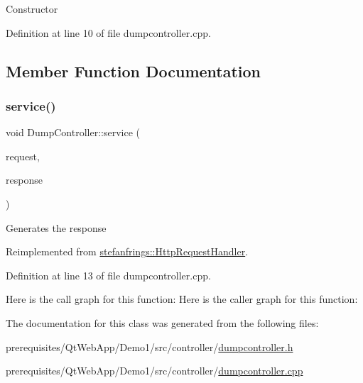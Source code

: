 Constructor 

Definition at line 10 of file dumpcontroller.\+cpp.



\subsection{Member Function Documentation}
\mbox{\label{class_dump_controller_ab2d5b920d9b2ec9310d2e57ed1e8e32f}} 
\subsubsection{\texorpdfstring{service()}{service()}}
{\footnotesize\ttfamily void Dump\+Controller\+::service (\begin{DoxyParamCaption}\item[{\mbox{\hyperlink{classstefanfrings_1_1_http_request}{Http\+Request}} \&}]{request,  }\item[{\mbox{\hyperlink{classstefanfrings_1_1_http_response}{Http\+Response}} \&}]{response }\end{DoxyParamCaption})\hspace{0.3cm}{\ttfamily [virtual]}}

Generates the response 

Reimplemented from \mbox{\hyperlink{classstefanfrings_1_1_http_request_handler_a0a7210907152c46b8b5a47feb64cf6bd}{stefanfrings\+::\+Http\+Request\+Handler}}.



Definition at line 13 of file dumpcontroller.\+cpp.

Here is the call graph for this function\+:
Here is the caller graph for this function\+:


The documentation for this class was generated from the following files\+:\begin{DoxyCompactItemize}
\item 
prerequisites/\+Qt\+Web\+App/\+Demo1/src/controller/\mbox{\hyperlink{dumpcontroller_8h}{dumpcontroller.\+h}}\item 
prerequisites/\+Qt\+Web\+App/\+Demo1/src/controller/\mbox{\hyperlink{dumpcontroller_8cpp}{dumpcontroller.\+cpp}}\end{DoxyCompactItemize}
